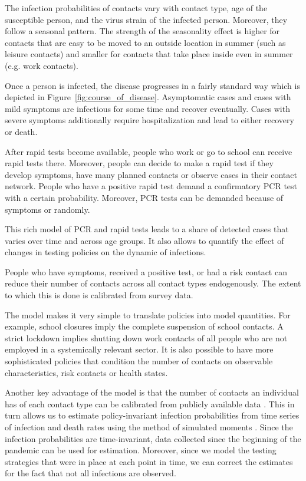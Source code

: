 The infection probabilities of contacts vary with contact type, age of the susceptible
person, and the virus strain of the infected person. Moreover, they follow a seasonal
pattern. The strength of the seasonality effect is higher for contacts that are easy to
be moved to an outside location in summer (such as leisure contacts) and smaller for
contacts that take place inside even in summer (e.g. work contacts).

Once a person is infected, the disease progresses in a fairly standard way which is
depicted in Figure~\ref{fig:course_of_disease}. Asymptomatic cases and cases with mild
symptoms are infectious for some time and recover eventually. Cases with severe symptoms
additionally require hospitalization and lead to either recovery or death.

After rapid tests become available, people who work or go to school can receive rapid
tests there. Moreover, people can decide to make a rapid test if they develop symptoms,
have many planned contacts or observe cases in their contact network. People who have a
positive rapid test demand a confirmatory PCR test with a certain probability. Moreover,
PCR tests can be demanded because of symptoms or randomly.

This rich model of PCR and rapid tests leads to a share of detected cases that varies
over time and across age groups. It also allows to quantify the effect of changes in
testing policies on the dynamic of infections.

People who have symptoms, received a positive test, or had a risk contact can reduce
their number of contacts across all contact types endogenously. The extent to which this
is done is calibrated from survey data.

The model makes it very simple to translate policies into model quantities. For example,
school closures imply the complete suspension of school contacts. A strict lockdown
implies shutting down work contacts of all people who are not employed in a systemically
relevant sector. It is also possible to have more sophisticated policies that condition
the number of contacts on observable characteristics, risk contacts or health states.

Another key advantage of the model is that the number of contacts an individual has of
each contact type can be calibrated from publicly available data \citep{Mossong2008}.
This in turn allows us to estimate policy-invariant infection probabilities from time
series of infection and death rates using the method of simulated moments
\citep{McFadden1989}. Since the infection probabilities are time-invariant, data
collected since the beginning of the pandemic can be used for estimation. Moreover,
since we model the testing strategies that were in place at each point in time, we can
correct the estimates for the fact that not all infections are observed.

